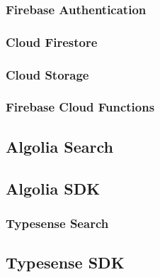 \subsubsection{Firebase Authentication}


\subsubsection{Cloud Firestore}
\subsubsection{Cloud Storage}
\subsubsection{Firebase Cloud Functions}
\subsection{Algolia Search}
\subsection{Algolia SDK}

\subsubsection{Typesense Search}
\subsection{Typesense SDK}
